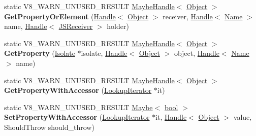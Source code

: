 \begin{DoxyCompactItemize}
\item 
\mbox{\label{classv8_1_1internal_1_1Object_a0380d3e43b2448b4d536964b1d7dede7}} 
static V8\+\_\+\+W\+A\+R\+N\+\_\+\+U\+N\+U\+S\+E\+D\+\_\+\+R\+E\+S\+U\+LT \mbox{\hyperlink{classv8_1_1internal_1_1MaybeHandle}{Maybe\+Handle}}$<$ \mbox{\hyperlink{classv8_1_1internal_1_1Object}{Object}} $>$ {\bfseries Get\+Property\+Or\+Element} (\mbox{\hyperlink{classv8_1_1internal_1_1Handle}{Handle}}$<$ \mbox{\hyperlink{classv8_1_1internal_1_1Object}{Object}} $>$ receiver, \mbox{\hyperlink{classv8_1_1internal_1_1Handle}{Handle}}$<$ \mbox{\hyperlink{classv8_1_1internal_1_1Name}{Name}} $>$ name, \mbox{\hyperlink{classv8_1_1internal_1_1Handle}{Handle}}$<$ \mbox{\hyperlink{classv8_1_1internal_1_1JSReceiver}{J\+S\+Receiver}} $>$ holder)
\item 
\mbox{\label{classv8_1_1internal_1_1Object_a561a0834a9d80487d22c94c061a14bb3}} 
static V8\+\_\+\+W\+A\+R\+N\+\_\+\+U\+N\+U\+S\+E\+D\+\_\+\+R\+E\+S\+U\+LT \mbox{\hyperlink{classv8_1_1internal_1_1MaybeHandle}{Maybe\+Handle}}$<$ \mbox{\hyperlink{classv8_1_1internal_1_1Object}{Object}} $>$ {\bfseries Get\+Property} (\mbox{\hyperlink{classv8_1_1internal_1_1Isolate}{Isolate}} $\ast$isolate, \mbox{\hyperlink{classv8_1_1internal_1_1Handle}{Handle}}$<$ \mbox{\hyperlink{classv8_1_1internal_1_1Object}{Object}} $>$ object, \mbox{\hyperlink{classv8_1_1internal_1_1Handle}{Handle}}$<$ \mbox{\hyperlink{classv8_1_1internal_1_1Name}{Name}} $>$ name)
\item 
\mbox{\label{classv8_1_1internal_1_1Object_a110ef101c1f7db3f660758448a83681b}} 
static V8\+\_\+\+W\+A\+R\+N\+\_\+\+U\+N\+U\+S\+E\+D\+\_\+\+R\+E\+S\+U\+LT \mbox{\hyperlink{classv8_1_1internal_1_1MaybeHandle}{Maybe\+Handle}}$<$ \mbox{\hyperlink{classv8_1_1internal_1_1Object}{Object}} $>$ {\bfseries Get\+Property\+With\+Accessor} (\mbox{\hyperlink{classv8_1_1internal_1_1LookupIterator}{Lookup\+Iterator}} $\ast$it)
\item 
\mbox{\label{classv8_1_1internal_1_1Object_af4e940f445605f04cbb99761daa02e22}} 
static V8\+\_\+\+W\+A\+R\+N\+\_\+\+U\+N\+U\+S\+E\+D\+\_\+\+R\+E\+S\+U\+LT \mbox{\hyperlink{classv8_1_1Maybe}{Maybe}}$<$ \mbox{\hyperlink{classbool}{bool}} $>$ {\bfseries Set\+Property\+With\+Accessor} (\mbox{\hyperlink{classv8_1_1internal_1_1LookupIterator}{Lookup\+Iterator}} $\ast$it, \mbox{\hyperlink{classv8_1_1internal_1_1Handle}{Handle}}$<$ \mbox{\hyperlink{classv8_1_1internal_1_1Object}{Object}} $>$ value, Should\+Throw should\+\_\+throw)

\end{DoxyCompactItemize}
